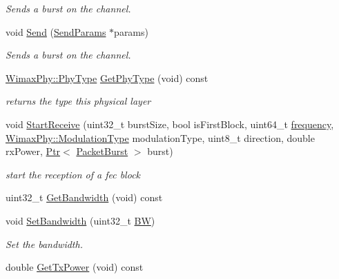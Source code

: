 \begin{DoxyCompactItemize}
\begin{DoxyCompactList}\small\item\em Sends a burst on the channel. \end{DoxyCompactList}\item 
void \hyperlink{classns3_1_1SimpleOfdmWimaxPhy_a8df8042b7b44fdf471addecf6c41f074}{Send} (\hyperlink{classns3_1_1SendParams}{Send\+Params} $\ast$params)
\begin{DoxyCompactList}\small\item\em Sends a burst on the channel. \end{DoxyCompactList}\item 
\hyperlink{classns3_1_1WimaxPhy_a30c76d3d1853c49c26edef12338cf6b4}{Wimax\+Phy\+::\+Phy\+Type} \hyperlink{classns3_1_1SimpleOfdmWimaxPhy_ae52797d3cc95324bcc5ff0a6e1aee2c1}{Get\+Phy\+Type} (void) const 
\begin{DoxyCompactList}\small\item\em returns the type this physical layer \end{DoxyCompactList}\item 
void \hyperlink{classns3_1_1SimpleOfdmWimaxPhy_afd0ada1680b119d166fb3cf65d804f13}{Start\+Receive} (uint32\+\_\+t burst\+Size, bool is\+First\+Block, uint64\+\_\+t \hyperlink{mmwave_2model_2fading-traces_2fading__trace__generator_8m_a09045328d6d7e16aa4013f526cc6993d}{frequency}, \hyperlink{classns3_1_1WimaxPhy_a044c5d8a48ca992c39c2a946f6e755fa}{Wimax\+Phy\+::\+Modulation\+Type} modulation\+Type, uint8\+\_\+t direction, double rx\+Power, \hyperlink{classns3_1_1Ptr}{Ptr}$<$ \hyperlink{classns3_1_1PacketBurst}{Packet\+Burst} $>$ burst)
\begin{DoxyCompactList}\small\item\em start the reception of a fec block \end{DoxyCompactList}\item 
uint32\+\_\+t \hyperlink{classns3_1_1SimpleOfdmWimaxPhy_a3ca7aecb410b74cb11d9ec9c4e4a3c53}{Get\+Bandwidth} (void) const 
\item 
void \hyperlink{classns3_1_1SimpleOfdmWimaxPhy_ab78fd41b984831d8a2093b1f2594af38}{Set\+Bandwidth} (uint32\+\_\+t \hyperlink{generate__test__data__lte__sinr_8m_a477d3f5b3663f80429624b8b8b73a0cb}{BW})
\begin{DoxyCompactList}\small\item\em Set the bandwidth. \end{DoxyCompactList}\item 
double \hyperlink{classns3_1_1SimpleOfdmWimaxPhy_a1b8b0f59960472009964cf7f115214d9}{Get\+Tx\+Power} (void) const 

\end{DoxyCompactItemize}
